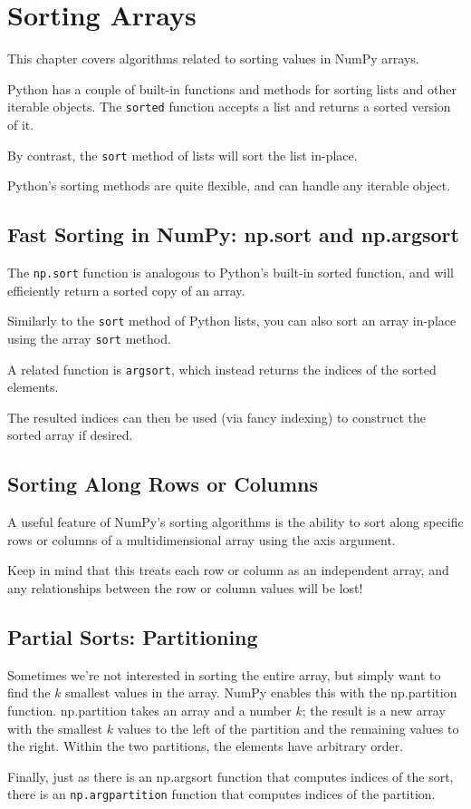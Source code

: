 \chapter{Sorting Arrays}
This chapter covers algorithms related to sorting values in
NumPy arrays.

Python has a couple of built-in functions and methods for sorting lists and other
iterable objects. The \verb|sorted| function accepts a list and returns a sorted version of it.

By contrast, the \verb|sort|  method of lists will sort the list in-place.

Python's sorting methods are quite flexible, and can handle any iterable object.
\section{Fast Sorting in NumPy: np.sort and np.argsort}
The \verb|np.sort| function is analogous to Python's built-in sorted function, and will efficiently return a sorted copy of an array.

Similarly to the \verb|sort| method of Python lists, you can also sort an array in-place using
the array \verb|sort| method.

A related function is \verb|argsort|, which instead returns the indices of the sorted elements.

The resulted indices can then be used (via fancy indexing) to construct the sorted array if desired.

\section{Sorting Along Rows or Columns}
A useful feature of NumPy's sorting algorithms is the ability to sort along specific
rows or columns of a multidimensional array using the axis argument.

Keep in mind that this treats each row or column as an independent array, and any
relationships between the row or column values will be lost!

\section{Partial Sorts: Partitioning}
Sometimes we're not interested in sorting the entire array, but simply want to find the
$k$ smallest values in the array. NumPy enables this with the np.partition function.
np.partition takes an array and a number $k$; the result is a new array with the smallest $k$ values to the left of the partition and the remaining values to the right. Within the
two partitions, the elements have arbitrary order.

Finally, just as there is an np.argsort function that computes indices of the sort,
there is an \verb|np.argpartition| function that computes indices of the partition.


